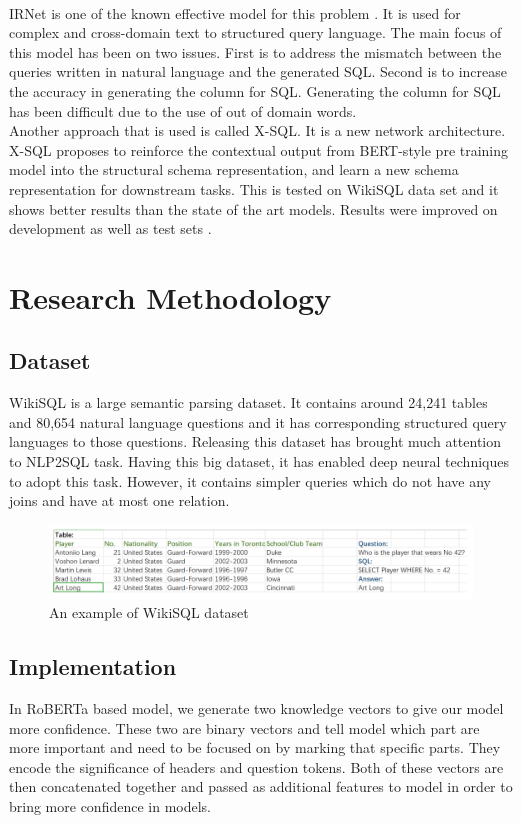 \documentclass[12pt]{article}
\begin{document}
\\IRNet is one of the known effective model for this problem \cite{guo2019towards}. It is used for complex and cross-domain text to structured query language. The main focus of this model has been on two issues. First is to address the mismatch between the queries written in natural language and the generated SQL. Second is to increase the accuracy in generating the column for SQL. Generating the column for SQL has been difficult due to the use of out of domain words. 
\\Another approach that is used is called X-SQL. It is a new network architecture. X-SQL proposes to reinforce the contextual output from BERT-style pre training model into the structural schema representation, and learn a new schema representation for downstream tasks. This is tested on WikiSQL data set and it shows better results than the state of the art models. Results were improved on development as well as test sets \cite{bogin2019global}.






\section{Research Methodology}
\subsection{Dataset}
WikiSQL is a large semantic parsing dataset. It contains around 24,241 tables and 80,654 natural language questions and it has corresponding structured query languages to those questions. Releasing this dataset has brought much attention to NLP2SQL task. Having this big dataset, it has enabled deep neural techniques to adopt this task. However, it contains simpler queries which do not have any joins and have at most one relation. 
\begin{figure}[H]
    \includegraphics[width=450pt]{wikisql}
	\caption{An example of WikiSQL dataset}
    \label{fig:WikiSQL}
\end{figure}


\subsection{Implementation}
In RoBERTa based model, we generate two knowledge vectors to give our model more confidence. These two are binary vectors and tell model which part are more important and need to be focused on by marking that specific parts. They encode the significance of headers and question tokens. Both of these vectors are then concatenated together and passed as additional features to model in order to bring more confidence in models. 
\end{document}
